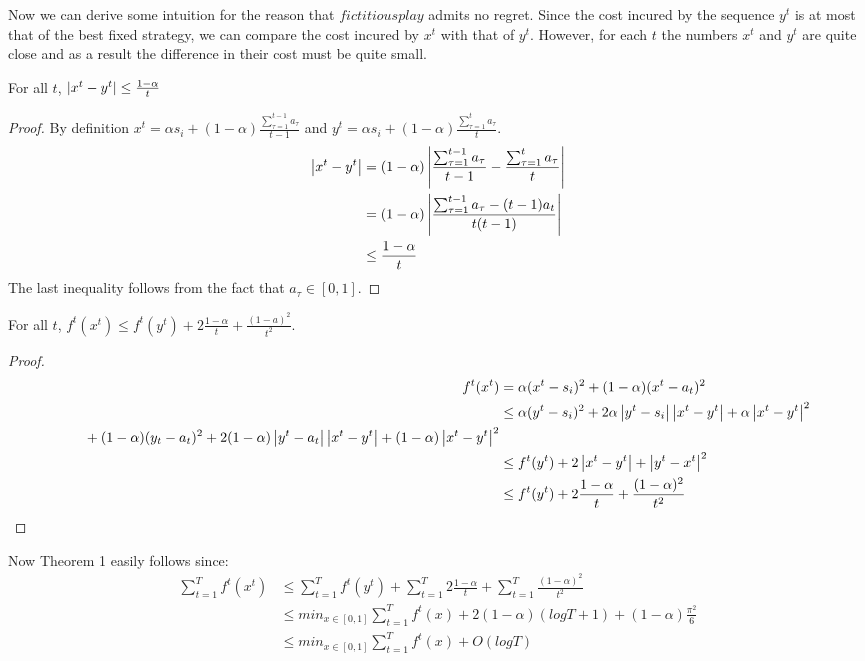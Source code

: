 Now we can derive some intuition for the reason that $fictitious play$ admits no regret. Since the cost incured by the sequence $y^t$ is at most that of the best fixed strategy, we can compare the cost incured by $x^t$ with that of $y^t$. However, for each $t$ the numbers $x^t$ and $y^t$ are quite close and as a result the difference in their cost must be quite small. 
\begin{lemma} For all $t$, $\left|x^t - y^t \right| \leq \frac{1-\alpha}{t}$
\end{lemma}
\begin{proof} By definition $x^t = \alpha s_i + (1-\alpha)\frac{\sum_{\tau = 1}^{t-1} a_\tau}{t-1}$ and $ y^t = \alpha s_i + (1-\alpha)\frac{\sum_{\tau = 1}^t a_\tau}{t}$.
\begin{align*}
\left|x^t - y^t\right| &= (1-\alpha)\left|\frac{\sum_{\tau = 1}^{t-1}a_\tau}{t-1} - \frac{\sum_{\tau = 1}^t a_\tau}{t}\right|\\
&= (1-\alpha)\left|\frac{\sum_{\tau = 1}^{t-1}a_\tau -(t-1)a_t}{t(t-1)}\right|\\
&\leq \frac{1-\alpha}{t}
\end{align*}
The last inequality follows from the fact that $a_\tau \in [0,1]$.
\end{proof}

\begin{lemma}For all $t$, $f^t(x^t) \leq f^t(y^t) + 2\frac{1-\alpha}{t} + \frac{(1-a)^2}{t^2}$. 
\end{lemma}
\begin{proof}
\begin{align*}
f^t(x^t) &= \alpha(x^t - s_i)^2 + (1 - \alpha)(x^t - a_t)^2 \\
&\leq \alpha(y^t - s_i)^2 + 2\alpha\lp|y^t - s_i\rp|\lp|x^t - y^t\rp| + \alpha \lp|x^t - y^t\rp|^2 \\
\phantom{{}\leq{}}+ (1-\alpha)(y_t - a_t)^2 + 2(1-\alpha)\lp|y^t - a_t\rp|\lp|x^t-y^t\rp| + (1 - \alpha)\lp|x^t - y^t\rp|^2\\
&\leq f^t(y^t) + 2\lp|x^t - y^t\rp| + \lp|y^t - x^t\rp|^2\\
&\leq f^t(y^t) + 2\frac{1-\alpha}{t} + \frac{(1-\alpha)^2}{t^2}
\end{align*}
\end{proof}
Now Theorem 1 easily follows since:
\begin{align*}
\sum_{t=1}^T f^t(x^t) &\leq \sum_{t=1}^T f^t(y^t) + \sum_{t=1}^T 2\frac{1-\alpha}{t} + \sum_{t=1}^T \frac{(1-\alpha)^2}{t^2}\\
&\leq  min_{x \in [0,1]} \sum_{t=1}^T f^t(x) + 2(1-\alpha)(logT + 1) + (1-\alpha)\frac{\pi^2}{6}\\
&\leq min_{x \in [0,1]} \sum_{t=1}^T f^t(x) + O(logT)
\end{align*}







